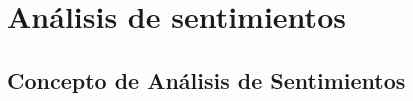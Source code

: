 \chapter{Análisis de sentimientos}

\section{Concepto de Análisis de Sentimientos} \label{conceptsentiment}




